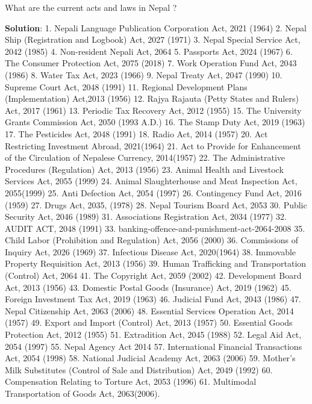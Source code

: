 \documentclass[
]{book}
\newcommand{\question}{\item}
\newenvironment{solution}{ {\bfseries Solution}:}{}
\begin{document}
\begin{questions}

\question What are the current acts and laws in Nepal ?

\begin{solution}
1. Nepali Language Publication Corporation Act, 2021 (1964)
2. Nepal Ship (Registration and Logbook) Act, 2027 (1971)
3. Nepal Special Service Act, 2042 (1985)
4. Non-resident Nepali Act, 2064
5. Passports Act, 2024 (1967)
6. The Consumer Protection Act, 2075 (2018)
7. Work Operation Fund Act, 2043 (1986)
8. Water Tax Act, 2023 (1966)
9. Nepal Treaty Act, 2047 (1990)
10. Supreme Court Act, 2048 (1991)
11. Regional Development Plans (Implementation) Act,2013 (1956)
12. Rajya Rajauta (Petty States and Rulers) Act, 2017 (1961)
13. Periodic Tax Recovery Act, 2012 (1955)
15. The University Grants Commission Act, 2050 (1993 A.D.)
16. The Stamp Duty Act, 2019 (1963)
17. The Pesticides Act, 2048 (1991)
18. Radio Act, 2014 (1957)
20. Act Restricting Investment Abroad, 2021(1964)
21. Act to Provide for Enhancement of the Circulation of Nepalese Currency, 2014(1957)
22. The Administrative Procedures (Regulation) Act, 2013 (1956)
23. Animal Health and Livestock Services Act, 2055 (1999)
24. Animal Slaughterhouse and Meat Inspection Act, 2055(1999)
25. Anti Defection Act, 2054 (1997)
26. Contingency Fund Act, 2016 (1959)
27. Drugs Act, 2035, (1978)
28. Nepal Tourism Board Act, 2053
30. Public Security Act, 2046 (1989)
31. Associations Registration Act, 2034 (1977)
32. AUDIT ACT, 2048 (1991)
33. banking-offence-and-punishment-act-2064-2008
35. Child Labor (Prohibition and Regulation) Act, 2056 (2000)
36. Commissions of Inquiry Act, 2026 (1969)
37. Infectious Disease Act, 2020(1964)
38. Immovable Property Requisition Act, 2013 (1956)
39. Human Trafficking and Transportation (Control) Act, 2064
41. The Copyright Act, 2059 (2002)
42. Development Board Act, 2013 (1956)
43. Domestic Postal Goods (Insurance) Act, 2019 (1962)
45. Foreign Investment Tax Act, 2019 (1963)
46. Judicial Fund Act, 2043 (1986)
47. Nepal Citizenship Act, 2063 (2006)
48. Essential Services Operation Act, 2014 (1957)
49. Export and Import (Control) Act, 2013 (1957)
50. Essential Goods Protection Act, 2012 (1955)
51. Extradition Act, 2045 (1988)
52. Legal Aid Act, 2054 (1997)
55. Nepal Agency Act 2014
57. International Financial Transactions Act, 2054 (1998)
58. National Judicial Academy Act, 2063 (2006)
59. Mother's Milk Substitutes (Control of Sale and Distribution) Act, 2049 (1992)
60. Compensation Relating to Torture Act, 2053 (1996)
61. Multimodal Transportation of Goods Act, 2063(2006).

\end{solution}
\end{questions}
\end{document}
